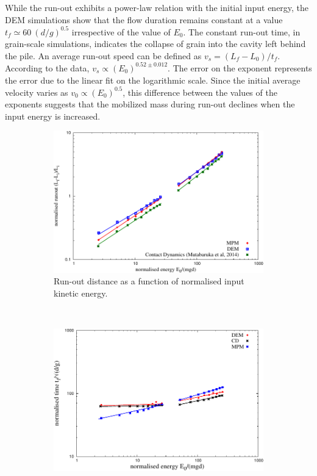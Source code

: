 While the run-out exhibits a power-law relation with the initial input energy, 
the DEM simulations show that the flow duration remains constant at a value  
$t_f \simeq 60 \  (d/g)^{0.5}$ irrespective of the value of $E_0$. The constant 
run-out time, in grain-scale simulations, indicates the collapse of grain into 
the cavity left behind the pile. An average run-out speed can be defined as 
$v_s = (L_f - L_0) / t_f$. According to the data, $v_s \propto 
(E_0)^{0.52\pm 0.012}$. The error on the exponent represents the 
error due to the linear fit on the logarithmic scale. Since the initial 
average velocity varies as $v_0 \propto (E_0)^{0.5}$, this difference between 
the values of the exponents suggests that the mobilized mass during run-out 
declines when the input energy is increased.


\begin{figure}[tbph]
\centering
\begin{subfigure}[b]{0.975\textwidth}
\centering
\includegraphics[width=\textwidth]{Runout_Eo_MPM_CD_DEM}
\caption{Run-out distance as a function of normalised input kinetic energy.}
\label{fig:Runout_Eo_MPM_CD_DEM}
\end{subfigure}
\\
\begin{subfigure}[b]{0.975\textwidth}
\centering
\includegraphics[width=\textwidth]{Tf_vs_Eo_Slope}

\end{subfigure}
\end{figure}
